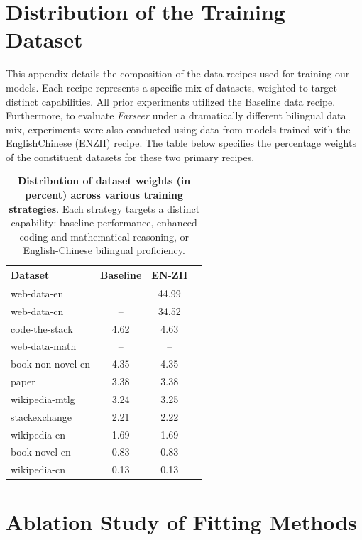 \documentclass{article}
\begin{document}
\section{Distribution of the Training Dataset}
\label{app:training_distribution}

This appendix details the composition of the data recipes used for training our models. Each recipe represents a specific mix of datasets, weighted to target distinct capabilities. All prior experiments utilized the Baseline data recipe. Furthermore, to evaluate \textit{Farseer} under a dramatically different bilingual data mix, experiments were also conducted using data from models trained with the English\text{-}Chinese (EN\text{-}ZH) recipe. The table below specifies the percentage weights of the constituent datasets for these two primary recipes.


\begin{table}[h!]
\small
    \caption{\textbf{Distribution of dataset weights (in percent) across various training strategies}. Each strategy targets a distinct capability: baseline performance, enhanced coding and mathematical reasoning, or English-Chinese bilingual proficiency.}
    \centering
    \begin{tabular}{lccc}
    \toprule
    \textbf{Dataset} & \textbf{Baseline} & \textbf{EN{-}ZH} \\
    \midrule
    web-data-en & \centering 79.53 & 44.99 \\
    web-data-cn & -- & 34.52 \\
    code-the-stack & 4.62 & 4.63 \\
    web-data-math & -- & -- \\
    book-non-novel-en & 4.35 & 4.35 \\
    paper & 3.38 & 3.38 \\
    wikipedia-mtlg & 3.24 & 3.25 \\
    stackexchange & 2.21 & 2.22 \\
    wikipedia-en & 1.69 & 1.69 \\
    book-novel-en & 0.83 & 0.83 \\
    wikipedia-cn & 0.13 & 0.13 \\
    \bottomrule
    \end{tabular}
    \label{tab:data_recipes}
\end{table}

\FloatBarrier


\section{Ablation Study of Fitting Methods}
\label{app:ablation_fitting}
    
\end{document}
